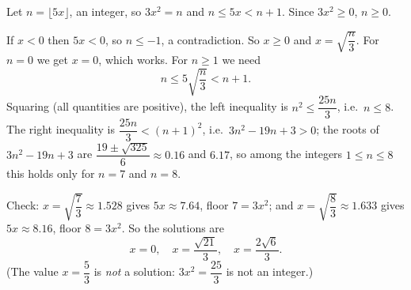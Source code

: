 Let $n=\lfloor5x\rfloor$, an integer, so $3x^2=n$ and $n\le5x<n+1$. Since $3x^2\ge0$, $n\ge0$.

If $x<0$ then $5x<0$, so $n\le-1$, a contradiction. So $x\ge0$ and $x=\sqrt{\dfrac {n}{3}}$. For $n=0$ we get $x=0$, which works. For $n\ge1$ we need
\[
n\le5\sqrt{\dfrac {n}{3}}<n+1 .
\]
Squaring (all quantities are positive), the left inequality is $n^2\le\dfrac{25n}{3}$, i.e.\ $n\le8$. The right inequality is $\dfrac{25n}{3}<(n+1)^2$, i.e.\ $3n^2-19n+3>0$; the roots of $3n^2-19n+3$ are $\dfrac{19\pm\sqrt{325}}{6}\approx0.16$ and $6.17$, so among the integers $1\le n\le8$ this holds only for $n=7$ and $n=8$.

Check: $x=\sqrt{\dfrac{7}{3}}\approx1.528$ gives $5x\approx7.64$, floor $7=3x^2$; and $x=\sqrt{\dfrac{8}{3}}\approx1.633$ gives $5x\approx8.16$, floor $8=3x^2$. So the solutions are
\[
\boxed{x=0,\quad x=\dfrac{\sqrt{21}}{3},\quad x=\dfrac{2\sqrt6}{3}}.
\]
(The value $x=\dfrac{5}{3}$ is \emph{not} a solution: $3x^2=\dfrac{25}{3}$ is not an integer.)
